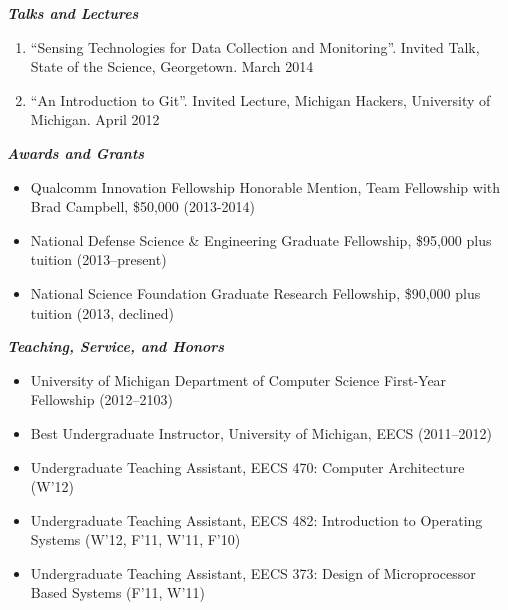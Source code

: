 \documentclass{article}
\begin{document}
{\bf {\em Talks and Lectures}}

\begin{enumerate}

\item ``Sensing Technologies for Data Collection and Monitoring''. Invited
  Talk, State of the Science, Georgetown. March 2014
\item ``An Introduction to Git''. Invited Lecture, Michigan Hackers,
University of Michigan. April 2012

\end{enumerate}

{\bf {\em Awards and Grants}}

\begin{itemize}

  \item Qualcomm Innovation Fellowship Honorable Mention, Team Fellowship with
    Brad Campbell, \$50,000 (2013-2014)
  \item National Defense Science \& Engineering Graduate Fellowship, \$95,000 plus tuition (2013--present)
  \item National Science Foundation Graduate Research Fellowship, \$90,000 plus tuition (2013, declined)

\end{itemize}

{\bf {\em Teaching, Service, and Honors}}

\begin{itemize}

\item University of Michigan Department of Computer Science First-Year Fellowship (2012--2103)
\item Best Undergraduate Instructor, University of Michigan, EECS (2011--2012)
\item Undergraduate Teaching Assistant, EECS 470: Computer Architecture (W'12)
\item Undergraduate Teaching Assistant, EECS 482: Introduction to Operating Systems (W'12, F'11, W'11, F'10)
\item Undergraduate Teaching Assistant, EECS 373: Design of Microprocessor Based Systems (F'11, W'11)

\end{itemize}
\end{document}
